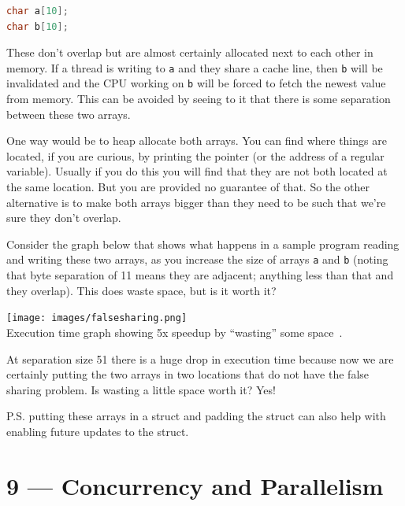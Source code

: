 \documentclass[a4paper]{report}
\begin{document}
\begin{lstlisting}[language=C]
char a[10];
char b[10];
\end{lstlisting}
These don't overlap but are almost certainly allocated next to each other in memory. If a thread is writing to \texttt{a} and they share a cache line, then \texttt{b} will be invalidated and the CPU working on \texttt{b} will be forced to fetch the newest value from memory. This can be avoided by seeing to it that there is some separation between these two arrays.

One way would be to heap allocate both arrays. You can find where things are located, if you are curious, by printing the pointer (or the address of a regular variable). Usually if you do this you will find that they are not both located at the same location. But you are provided no guarantee of that. So the other alternative is to make both arrays bigger than they need to be such that we're sure they don't overlap.

Consider the graph below that shows what happens in a sample program reading and writing these two arrays, as you increase the size of arrays \texttt{a} and \texttt{b} (noting that byte separation of 11 means they are adjacent; anything less than that and they overlap). This does waste space, but is it worth it?

\begin{center}
\texttt{[image: images/falsesharing.png]}\\
Execution time graph showing 5x speedup by ``wasting'' some space~\cite{falsesharing}.
\end{center}

At separation size 51 there is a huge drop in execution time because now we are certainly putting the two arrays in two locations that do not have the false sharing problem. Is wasting a little space worth it? Yes!

P.S. putting these arrays in a struct and padding the struct can also help with enabling future updates to the struct.









\chapter*{9 --- Concurrency and Parallelism}

\end{document}
